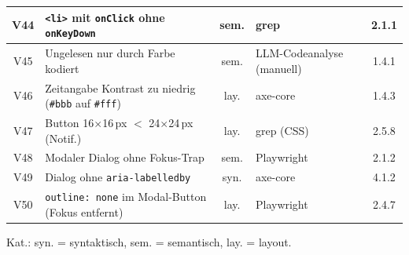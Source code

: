 \begin{longtable}{|c|p{6.4cm}|c|p{4.0cm}|c|}
V44 & \texttt{<li>} mit \texttt{onClick} ohne \texttt{onKeyDown}    & sem. & grep                    & 2.1.1 \\ \hline
V45 & Ungelesen nur durch Farbe kodiert                             & sem. & LLM-Codeanalyse (manuell)& 1.4.1 \\ \hline
V46 & Zeitangabe Kontrast zu niedrig (\texttt{\#bbb} auf \texttt{\#fff}) & lay. & axe-core           & 1.4.3 \\ \hline
V47 & Button 16$\times$16\,px $<$ 24$\times$24\,px (Notif.)         & lay. & grep (CSS)              & 2.5.8 \\ \hline
V48 & Modaler Dialog ohne Fokus-Trap                                & sem. & Playwright              & 2.1.2 \\ \hline
V49 & Dialog ohne \texttt{aria-labelledby}                          & syn. & axe-core                & 4.1.2 \\ \hline
V50 & \texttt{outline: none} im Modal-Button (Fokus entfernt)       & lay. & Playwright              & 2.4.7 \\ \hline
\end{longtable}
\begin{center}
\footnotesize Kat.: syn. = syntaktisch, sem. = semantisch, lay. = layout.
\end{center}

\clearpage

\label{app:erkennungsrate_poc_50}


